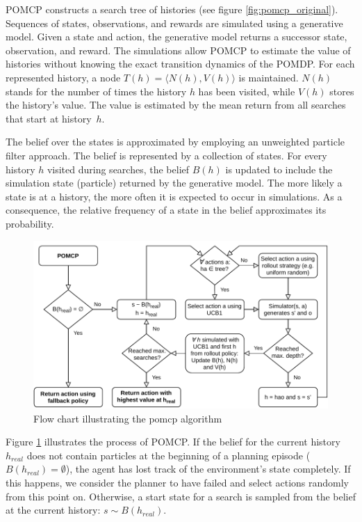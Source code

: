 \noindent
POMCP constructs a search tree of histories (see figure \ref{fig:pomcp_original}). Sequences of states, observations, and rewards are simulated using a generative model. Given a state and action, the generative model returns a successor state, observation, and reward. The simulations allow POMCP to estimate the value of histories without knowing the exact transition dynamics of the POMDP. For each represented history, a node $T(h) = \langle N(h), V(h) \rangle$ is maintained. $N(h)$ stands for the number of times the history $h$ has been visited, while $V(h)$ stores the history's value. The value is estimated by the mean return from all searches that start at history~$h$. 

The belief over the states is approximated by employing an unweighted particle filter approach. The belief is represented by a collection of states. For every history $h$ visited during searches, the belief $B(h)$ is updated to include the simulation state (particle) returned by the generative model. The more likely a state is at a history, the more often it is expected to occur in simulations. As a consequence, the relative frequency of a state in the belief approximates its probability.

\begin{figure}[htbp]
    \centerfloat
    \includegraphics[width=1.0\textwidth]{figures/POMCP.pdf}
    \caption{Flow chart illustrating the \acrfull{pomcp} algorithm}
    \label{fig:pomcp}
\end{figure}

Figure \ref{fig:pomcp} illustrates the process of POMCP.  If the belief for the current history $h_{real}$ does not contain particles at the beginning of a planning episode ($B(h_{real}) = \emptyset$), the agent has lost track of the environment's state completely. If this happens, we consider the planner to have failed and select actions randomly from this point on. Otherwise, a start state for a search is sampled from the belief at the current history: $ s \sim B(h_ {real})$. 


